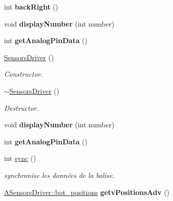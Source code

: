 \begin{DoxyCompactItemize}
int {\bfseries back\+Right} ()
\item 
\mbox{\label{classSensorsDriver_a0af2bde4cdb1f11d3a06f18a173b11bf}} 
void {\bfseries display\+Number} (int number)
\item 
\mbox{\label{classSensorsDriver_a4993195ba763b0c617dd3ff853768f20}} 
int {\bfseries get\+Analog\+Pin\+Data} ()
\item 
\mbox{\label{classSensorsDriver_a3da0016428e39e04021a7398ddec6cd7}} 
\hyperlink{classSensorsDriver_a3da0016428e39e04021a7398ddec6cd7}{Sensors\+Driver} ()
\begin{DoxyCompactList}\small\item\em Constructor. \end{DoxyCompactList}\item 
\mbox{\label{classSensorsDriver_aeb5bb8554d3bacd1cc267eedc2a8fb4d}} 
\hyperlink{classSensorsDriver_aeb5bb8554d3bacd1cc267eedc2a8fb4d}{$\sim$\+Sensors\+Driver} ()
\begin{DoxyCompactList}\small\item\em Destructor. \end{DoxyCompactList}\item 
\mbox{\label{classSensorsDriver_a0af2bde4cdb1f11d3a06f18a173b11bf}} 
void {\bfseries display\+Number} (int number)
\item 
\mbox{\label{classSensorsDriver_a4993195ba763b0c617dd3ff853768f20}} 
int {\bfseries get\+Analog\+Pin\+Data} ()
\item 
int \hyperlink{classSensorsDriver_a1bfbcc82461257094ed185fa2017afad}{sync} ()
\begin{DoxyCompactList}\small\item\em synchronise les données de la balise. \end{DoxyCompactList}\item 
\mbox{\label{classSensorsDriver_ac2b9d1fbaae6cbf09547f2a2d2e41af9}} 
\hyperlink{classASensorsDriver_a9743a29ef7d4faebd915f096f07bf729}{A\+Sensors\+Driver\+::bot\+\_\+positions} {\bfseries getv\+Positions\+Adv} ()
\item 
\mbox{\label{classSensorsDriver_ad9f2ff84de03a165c10848f8d9f21930}} 

\end{DoxyCompactItemize}

